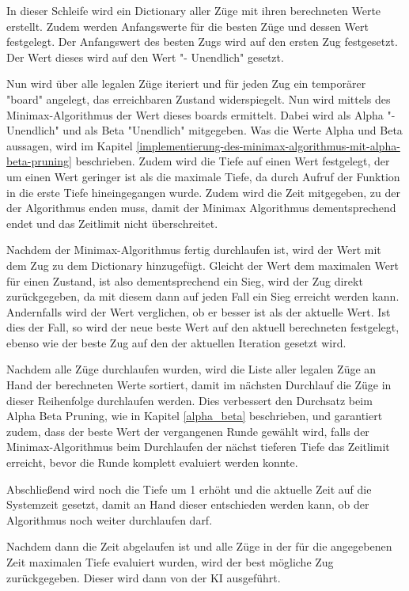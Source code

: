 In dieser Schleife wird ein Dictionary aller Züge mit ihren berechneten
Werte erstellt. Zudem werden Anfangswerte für die besten Züge und dessen
Wert festgelegt. Der Anfangswert des besten Zugs wird auf den ersten Zug
festgesetzt. Der Wert dieses wird auf den Wert "- Unendlich" gesetzt.

Nun wird über alle legalen Züge iteriert und für jeden Zug ein
temporärer "board" angelegt, das erreichbaren Zustand widerspiegelt. Nun
wird mittels des Minimax-Algorithmus der Wert dieses boards ermittelt.
Dabei wird als Alpha "- Unendlich" und als Beta "Unendlich" mitgegeben.
Was die Werte Alpha und Beta aussagen, wird im Kapitel \ref{implementierung-des-minimax-algorithmus-mit-alpha-beta-pruning}
beschrieben. Zudem wird die Tiefe auf einen Wert festgelegt, der um
einen Wert geringer ist als die maximale Tiefe, da durch Aufruf der
Funktion in die erste Tiefe hineingegangen wurde. Zudem wird die Zeit
mitgegeben, zu der der Algorithmus enden muss, damit der Minimax
Algorithmus dementsprechend endet und das Zeitlimit nicht überschreitet.

Nachdem der Minimax-Algorithmus fertig durchlaufen ist, wird der Wert
mit dem Zug zu dem Dictionary hinzugefügt. Gleicht der Wert dem
maximalen Wert für einen Zustand, ist also dementsprechend ein Sieg,
wird der Zug direkt zurückgegeben, da mit diesem dann auf jeden Fall ein
Sieg erreicht werden kann. Andernfalls wird der Wert verglichen, ob er
besser ist als der aktuelle Wert. Ist dies der Fall, so wird der neue
beste Wert auf den aktuell berechneten festgelegt, ebenso wie der beste
Zug auf den der aktuellen Iteration gesetzt wird.

Nachdem alle Züge durchlaufen wurden, wird die Liste aller legalen Züge
an Hand der berechneten Werte sortiert, damit im nächsten Durchlauf die
Züge in dieser Reihenfolge durchlaufen werden. Dies verbessert den
Durchsatz beim Alpha Beta Pruning, wie in Kapitel \ref{alpha_beta} beschrieben, und
garantiert zudem, dass der beste Wert der vergangenen Runde gewählt
wird, falls der Minimax-Algorithmus beim Durchlaufen der nächst tieferen
Tiefe das Zeitlimit erreicht, bevor die Runde komplett evaluiert werden
konnte.

Abschließend wird noch die Tiefe um 1 erhöht und die aktuelle Zeit auf
die Systemzeit gesetzt, damit an Hand dieser entschieden werden kann, ob
der Algorithmus noch weiter durchlaufen darf.

Nachdem dann die Zeit abgelaufen ist und alle Züge in der für die
angegebenen Zeit maximalen Tiefe evaluiert wurden, wird der best
mögliche Zug zurückgegeben. Dieser wird dann von der KI ausgeführt.

